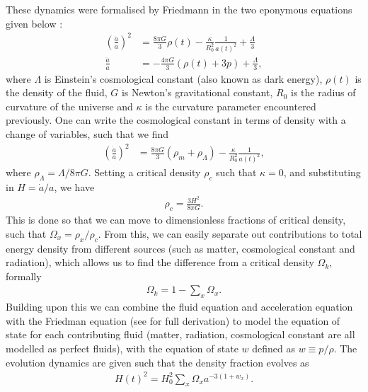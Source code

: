 \documentclass[titlesmallcaps, examinerscopy, copyrightpage]{uqthesis}
\begin{document}
These dynamics were formalised by Friedmann in the two eponymous equations given below \citep{RydenPartridge2004}:
\begin{align}
\left(\frac{\dot{a}}{a}\right)^2 &= \frac{8\pi G}{3} \rho(t) - \frac{\kappa}{R_0^2} \frac{1}{a(t)^2} + \frac{\Lambda}{3} \\
\frac{\ddot{a}}{a} &= - \frac{4\pi G}{3} (\rho(t) + 3p) + \frac{\Lambda}{3},
\end{align}
where $\Lambda$ is Einstein's cosmological constant (also known as dark energy), $\rho(t)$ is the density of the fluid, $G$ is Newton's gravitational constant, $R_0$ is the radius of curvature of the universe and $\kappa$ is the curvature parameter encountered previously. One can write the cosmological constant in terms of density with a change of variables, such that we find
\begin{align}
\left(\frac{\dot{a}}{a}\right)^2 &= \frac{8\pi G}{3} (\rho_m + \rho_\Lambda) - \frac{\kappa}{R_0^2} \frac{1}{a(t)^2},
\end{align}
where $\rho_\Lambda = \Lambda / 8\pi G$. Setting a critical density $\rho_c$ such that $\kappa = 0$, and substituting in $H = \dot{a}/a$, we have 
\begin{align}
\rho_c = \frac{3H^2}{8\pi G}.
\end{align}
This is done so that we can move to dimensionless fractions of critical density, such that $\Omega_x = \rho_x / \rho_c$. From this, we can easily separate out contributions to total energy density from different sources (such as matter, cosmological constant and radiation), which allows us to find the difference from a critical density $\Omega_k$, formally
\begin{align} \label{eq:omk}
\Omega_k = 1 - \sum_x \Omega_x.
\end{align}
Building upon this we can combine the fluid equation and acceleration equation with the Friedman equation (see \citet[Ch 4.2, 4.3]{RydenPartridge2004} for full derivation) to model the equation of state for each contributing fluid (matter, radiation, cosmological constant are all modelled as perfect fluids), with the equation of state $w$ defined as $w \equiv p/\rho$. The evolution dynamics are given such that the density fraction evolves as
\begin{align} \label{eq:hz}
H(t)^2 = H_0^2 \sum_x \Omega_x a^{-3(1+w_x)}.
\end{align}
\end{document}
